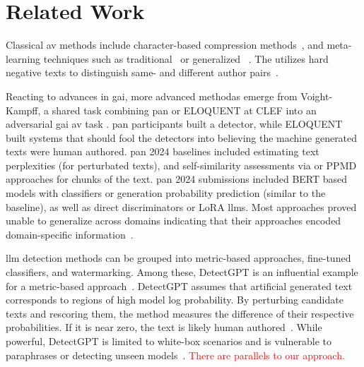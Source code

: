 \chapter{Related Work}
\label{chap:related_work}




Classical \ac{av} methods include character-based compression methods~\citep{tyo_state_2022,neal_surveying_2018}, and meta-learning techniques such as traditional~\citep{koppel_authorship_2004,koppel_authorship_2011} or generalized \unmasking{}~\citep{bevendorff_generalizing_2019,bevendorff_divergence_based_2020}.
The \impAppr{} utilizes hard negative texts to distinguish same- and different author pairs~\citep{koppel_determining_2014}.

Reacting to advances in \ac{gai}, more advanced methodas emerge from Voight-Kampff, a shared task combining \acs{pan} or ELOQUENT at CLEF into an adversarial \ac{gai} \ac{av} task .
\acs{pan} participants built a detector, while ELOQUENT built systems that should fool the detectors into believing the machine generated texts were human authored.
\acs{pan} 2024 baselines included estimating text perplexities (for perturbated texts), and self-similarity assessments via \unmasking{} or PPMD approaches for chunks of the text.
\acs{pan} 2024 submissions included BERT based models with classifiers or generation probability prediction (similar to the baseline), as well as direct discriminators or LoRA \acp{llm}.
Most approaches proved unable to generalize across domains indicating that their approaches encoded domain-specific information~\citep{bevendorff_overview_2024}.

\Ac{llm} detection methods can be grouped into metric-based approaches, fine-tuned classifiers, and watermarking. 
Among these, DetectGPT is an influential example for a metric-based approach~\citep{wang_stumbling_2024}.
DetectGPT assumes that artificial generated text corresponds to regions of high model log probability. 
By perturbing candidate texts and rescoring them, the method measures the difference of their respective probabilities.
If it is near zero, the text is likely human authored~\citep{mitchell_detectgpt_2023}. 
While powerful, DetectGPT is limited to white-box scenarios %
and is vulnerable to paraphrases or detecting unseen models~\citep{Wu_ODD_challenges_2025}.
\textcolor{red}{There are parallels to our approach.}

